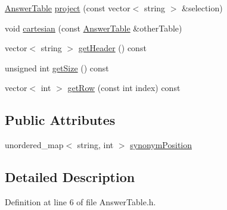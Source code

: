 \begin{DoxyCompactItemize}
\item 
\hyperlink{class_answer_table}{Answer\-Table} \hyperlink{class_answer_table_a44d359653923049566c8815d7f0616b2}{project} (const vector$<$ string $>$ \&selection)
\item 
void \hyperlink{class_answer_table_a6402136f56eccb33fd311b9c5208b884}{cartesian} (const \hyperlink{class_answer_table}{Answer\-Table} \&other\-Table)
\item 
vector$<$ string $>$ \hyperlink{class_answer_table_a7d8957160038486ced90cffc680d491c}{get\-Header} () const 
\item 
unsigned int \hyperlink{class_answer_table_af97a334c1ffcd4b185ddf8d981ef91bf}{get\-Size} () const 
\item 
vector$<$ int $>$ \hyperlink{class_answer_table_a28df331881ed15b3012b0d717109096c}{get\-Row} (const int index) const 
\end{DoxyCompactItemize}
\subsection*{Public Attributes}
\begin{DoxyCompactItemize}
\item 
unordered\-\_\-map$<$ string, int $>$ \hyperlink{class_answer_table_a53431094ba04eb9bc510e9cc63172fb1}{synonym\-Position}
\end{DoxyCompactItemize}


\subsection{Detailed Description}


Definition at line 6 of file Answer\-Table.\-h.



